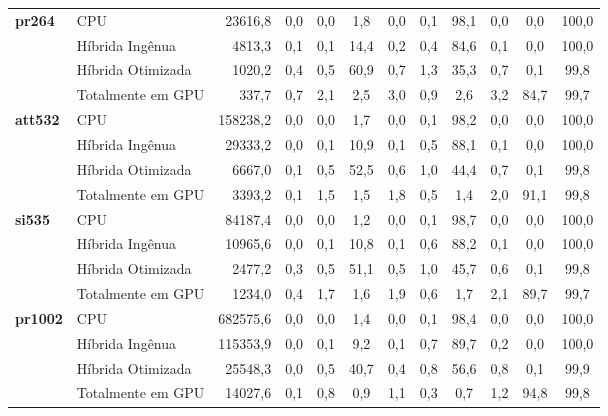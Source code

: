 \begin{table}[htbp]
\begin{tabeladensa}
\begin{tabular}{@{}llrccccccccc@{}}
      \midrule
      \textbf{pr264}    & CPU               & 23616,8    & 0,0   & 0,0  & 1,8   & 0,0  & 0,1   & 98,1 & 0,0   & 0,0   & 100,0 \\
                        & Híbrida Ingênua   & 4813,3     & 0,1   & 0,1  & 14,4  & 0,2  & 0,4   & 84,6 & 0,1   & 0,0   & 100,0 \\
                        & Híbrida Otimizada & 1020,2     & 0,4   & 0,5  & 60,9  & 0,7  & 1,3   & 35,3 & 0,7   & 0,1   & 99,8  \\
                        & Totalmente em GPU & 337,7      & 0,7   & 2,1  & 2,5   & 3,0  & 0,9   & 2,6  & 3,2   & 84,7  & 99,7  \\
      \midrule
      \textbf{att532}   & CPU               & 158238,2   & 0,0   & 0,0  & 1,7   & 0,0  & 0,1   & 98,2 & 0,0   & 0,0   & 100,0 \\
                        & Híbrida Ingênua   & 29333,2    & 0,0   & 0,1  & 10,9  & 0,1  & 0,5   & 88,1 & 0,1   & 0,0   & 100,0 \\
                        & Híbrida Otimizada & 6667,0     & 0,1   & 0,5  & 52,5  & 0,6  & 1,0   & 44,4 & 0,7   & 0,1   & 99,8  \\
                        & Totalmente em GPU & 3393,2     & 0,1   & 1,5  & 1,5   & 1,8  & 0,5   & 1,4  & 2,0   & 91,1  & 99,8  \\
      \midrule
      \textbf{si535}    & CPU               & 84187,4    & 0,0   & 0,0  & 1,2   & 0,0  & 0,1   & 98,7 & 0,0   & 0,0   & 100,0 \\
                        & Híbrida Ingênua   & 10965,6    & 0,0   & 0,1  & 10,8  & 0,1  & 0,6   & 88,2 & 0,1   & 0,0   & 100,0 \\
                        & Híbrida Otimizada & 2477,2     & 0,3   & 0,5  & 51,1  & 0,5  & 1,0   & 45,7 & 0,6   & 0,1   & 99,8  \\
                        & Totalmente em GPU & 1234,0     & 0,4   & 1,7  & 1,6   & 1,9  & 0,6   & 1,7  & 2,1   & 89,7  & 99,7  \\
      \midrule
      \textbf{pr1002}   & CPU               & 682575,6   & 0,0   & 0,0  & 1,4   & 0,0  & 0,1   & 98,4 & 0,0   & 0,0   & 100,0 \\
                        & Híbrida Ingênua   & 115353,9   & 0,0   & 0,1  & 9,2   & 0,1  & 0,7   & 89,7 & 0,2   & 0,0   & 100,0 \\
                        & Híbrida Otimizada & 25548,3    & 0,0   & 0,5  & 40,7  & 0,4  & 0,8   & 56,6 & 0,8   & 0,1   & 99,9  \\
                        & Totalmente em GPU & 14027,6    & 0,1   & 0,8  & 0,9   & 1,1  & 0,3   & 0,7  & 1,2   & 94,8  & 99,8  \\

\end{tabular}
\end{tabeladensa}
\end{table}
